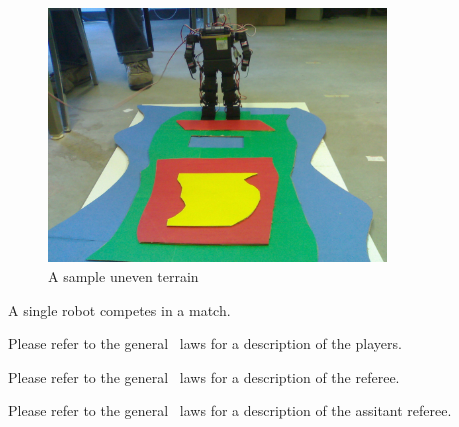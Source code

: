 \documentclass[12pt]{hurocup}
\begin{document}
\begin{lawlist}[LC]
  \begin{figure}
    \begin{center}
      \includegraphics[width=0.8\textwidth]{Figures/uneven-terrain}
    \end{center}
    \caption{A sample uneven terrain}
    \label{fig:uneven-terrain}
  \end{figure}

\end{lawlist}


\begin{lawlist}[LC]
\item A single robot competes in a match.
\end{lawlist}


Please refer to the general \HuroCup\ laws for a description of
the players.


Please refer to the general \HuroCup\ laws for a description of
the referee.


Please refer to the general \HuroCup\ laws for a description of
the assitant referee.

\end{document}

